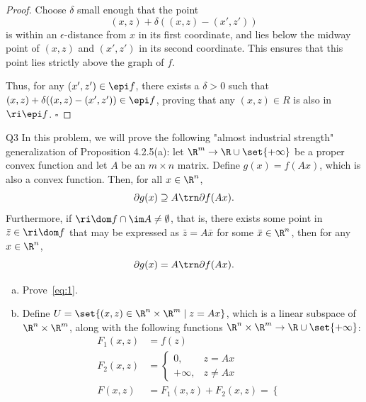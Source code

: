 \documentclass{article}
\theoremstyle{plain}
\theoremstyle{definition}
\theoremstyle{remark}
\begin{document}
\begin{solution}
\begin{enumerate}[(a)]
{\begin{proof}
                Choose $\delta$ small enough that the point
                \[ (x, z) + \delta((x, z) - (x', z')) \]
                is within an $\epsilon$-distance from $x$ in its first coordinate, and lies below the midway point of $(x, z)$ and $(x', z')$ in its second coordinate. This ensures that this point lies strictly above the graph of $f$.

                Thus, for any $(x', z') \in \epi f$, there exists a $\delta > 0$ such that $(x, z) + \delta((x, z) - (x', z')) \in \epi f$, proving that any $(x, z) \in R$ is also in $\ri\epi f$. \hfill $\square$
            \end{proof}
        }
    \end{enumerate}
\end{solution}

\begin{problem}
    {Q3}
    In this problem, we will prove the following "almost industrial strength" generalization of Proposition 4.2.5(a): let $\R^m\rightarrow\R\cup\set{+\infty}$ be a proper convex function and let $A$ be an $m\times n$ matrix. Define $g(x)=f(Ax)$, which is also a convex function. Then, for all $x\in \R^n$,
    \begin{equation}
        \partial g(x)\supseteq A\trn\partial f(Ax).\label{eq:1}
    \end{equation}
    Furthermore, if $\ri\dom f\cap\im A\neq\emptyset$, that is, there exists some point in $\bar{z}\in\ri\dom f$ that may be expressed as $\bar{z}=A\bar{x}$ for some $\bar{x}\in\R^n$, then for any $x\in\R^n$,
    \begin{equation}
        \partial g(x)=A\trn\partial f(Ax).\label{eq:2}
    \end{equation}
    \begin{enumerate}[(a)]
        \item Prove~\cref{eq:1}.
        \item Define $U=\set{(x,z)\in\R^n\times\R^m\mid z=Ax}$, which is a linear subspace of $\R^n\times\R^m$, along with the following functions $\R^n\times\R^m\rightarrow\R\cup\set{+\infty}$: {
            \begin{align*}
                F_1(x,z)&=f(z) \\
                F_2(x,z)&=\begin{cases}
                    0, & z=Ax \\
                    +\infty, & z\neq Ax
                \end{cases} \\
                F(x,z)&=F_1(x,z)+F_2(x,z)=\begin{cases}

\end{cases}
\end{align*}}
\end{enumerate}
\end{problem}
\end{document}
